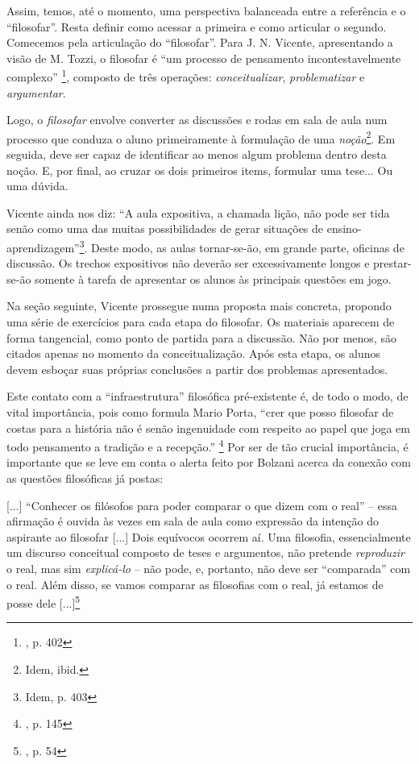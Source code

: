 \documentclass[12pt,a4paper]{article}
\newenvironment{citac}{
	\begin{addmargin}[4cm]{1em} \footnotesize}{\normalfont \end{addmargin}
}
\begin{document}
	Assim, temos, até o momento, uma perspectiva balanceada entre 
	a referência e o “filosofar”. Resta definir como acessar a 
	primeira e como articular o segundo. Comecemos pela articulação 
	do “filosofar”. Para J. N. Vicente, apresentando a visão de M. Tozzi, 
	o filosofar é “um processo de pensamento incontestavelmente complexo”
	\footnote{\cite{neves}, p. 402}, composto de três operações: 
	\emph{conceitualizar}, \emph{problematizar} e \emph{argumentar}. 

	Logo, o \emph{filosofar} envolve converter as discussões e rodas 
	em sala de aula num processo que conduza o aluno primeiramente 
	à formulação de uma \emph{noção}\footnote{Idem, ibid.}. 
	Em seguida, deve ser capaz de identificar ao menos algum problema 
	dentro desta noção. E, por final, ao cruzar os dois primeiros 
	items, formular uma tese... Ou uma dúvida. 

	Vicente ainda nos diz: “A aula expositiva, a chamada lição, não 
	pode ser tida senão como uma das muitas possibilidades de gerar 
	situações de ensino-aprendizagem”\footnote{Idem, p. 403}. 
	Deste modo, as aulas tornar-se-ão, em grande parte, oficinas de 
	discussão. Os trechos expositivos não deverão ser excessivamente 
	longos e prestar-se-ão somente à tarefa de apresentar os alunos 
	às principais questões em jogo. 

	Na seção seguinte, Vicente prossegue numa proposta mais concreta, 
	propondo uma série de exercícios para cada etapa do filosofar. Os 
	materiais aparecem de forma tangencial, como ponto de partida para 
	a discussão. Não por menos, são citados apenas no momento da 
	conceitualização. Após esta etapa, os alunos devem esboçar suas 
	próprias conclusões a partir dos problemas apresentados.  

	Este contato com a “infraestrutura” filosófica pré-existente é, 
	de todo o modo, de vital importância, pois
	como formula Mario Porta, “crer que posso 
	filosofar de costas para a história não é senão ingenuidade
	com respeito ao papel que joga em todo pensamento a tradição 
	e a recepção.” \footnote{\cite{porta}, p. 145}
	Por ser de tão crucial importância, é importante 
	que se leve em conta o alerta feito por Bolzani acerca da 
	conexão com as questões filosóficas já postas: 

	\begin{citac}
		[...] “Conhecer os filósofos para poder comparar o que 
		dizem com o real” -- essa afirmação é ouvida às vezes 
		em sala de aula como expressão da intenção do aspirante 
		ao filosofar [...] Dois equívocos ocorrem aí. Uma 
		filosofia, essencialmente um discurso conceitual composto 
		de teses e argumentos, não pretende \emph{reproduzir} o 
		real, mas sim \emph{explicá-lo} -- não pode, e, portanto, 
		não deve ser “comparada” com o real. Além disso, se vamos 
		comparar as filosofias com o real, já estamos de posse dele
		[...]\footnote{\cite{bolzani}, p. 54}
	\end{citac}
\end{document}
